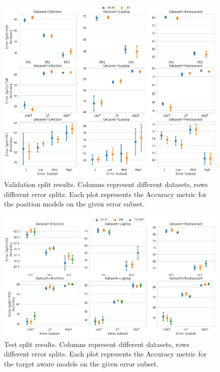 \begin{figure}[h!]
    \centering
    \includegraphics[scale=0.32]{images/augmentation/methods_performance/Position_Encoding/position_split_overall_validation_results.png}
    \caption{Validation split results. Columns represent different datasets, rows different error splits. Each plot represents the Accuracy metric for the position models on the given error subset.}
    \label{fig:aug_position_split_overall_validation_results}
\end{figure}

\begin{figure}[!h]
    \centering
    \includegraphics[scale=0.3]{images/augmentation/methods_performance/Inter_Target/inter_target_encoding_split_overall_test.png}
    \caption{Test split results. Columns represent different datasets, rows different error splits. Each plot represents the Accuracy metric for the target aware models on the given error subset.}
    \label{fig:aug_inter_target_encoding_split_overall_test}
\end{figure}


